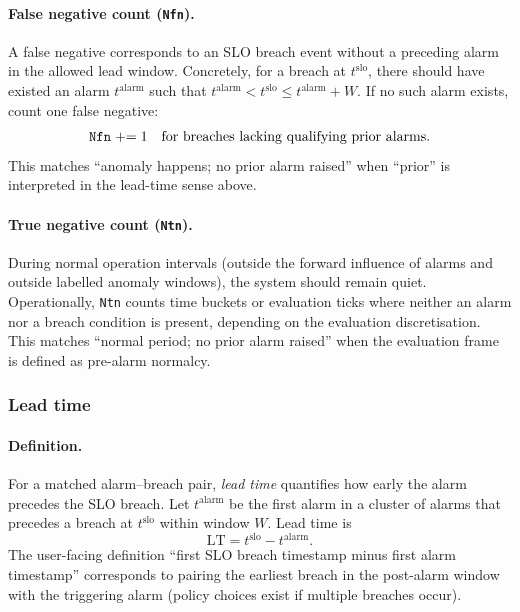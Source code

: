 \documentclass[11pt,a4paper]{article}
\begin{document}
\paragraph{False negative count (\texttt{Nfn}).}
A false negative corresponds to an SLO breach event without a preceding alarm in the allowed lead window. Concretely, for a breach at $t^{\mathrm{slo}}$, there should have existed an alarm $t^{\mathrm{alarm}}$ such that $t^{\mathrm{alarm}} < t^{\mathrm{slo}} \le t^{\mathrm{alarm}}+W$. If no such alarm exists, count one false negative:
\begin{equation}
  \text{\texttt{Nfn}} \mathrel{+}= 1 \quad \text{for breaches lacking qualifying prior alarms.}
\end{equation}
This matches ``anomaly happens; no prior alarm raised'' when ``prior'' is interpreted in the lead-time sense above.

\paragraph{True negative count (\texttt{Ntn}).}
During normal operation intervals (outside the forward influence of alarms and outside labelled anomaly windows), the system should remain quiet. Operationally, \texttt{Ntn} counts time buckets or evaluation ticks where neither an alarm nor a breach condition is present, depending on the evaluation discretisation. This matches ``normal period; no prior alarm raised'' when the evaluation frame is defined as pre-alarm normalcy.

\subsubsection*{Lead time}

\paragraph{Definition.}
For a matched alarm--breach pair, \emph{lead time} quantifies how early the alarm precedes the SLO breach. Let $t^{\mathrm{alarm}}$ be the first alarm in a cluster of alarms that precedes a breach at $t^{\mathrm{slo}}$ within window $W$. Lead time is
\begin{equation}
  \mathrm{LT} = t^{\mathrm{slo}} - t^{\mathrm{alarm}}.
\end{equation}
The user-facing definition ``first SLO breach timestamp minus first alarm timestamp'' corresponds to pairing the earliest breach in the post-alarm window with the triggering alarm (policy choices exist if multiple breaches occur).
\end{document}
